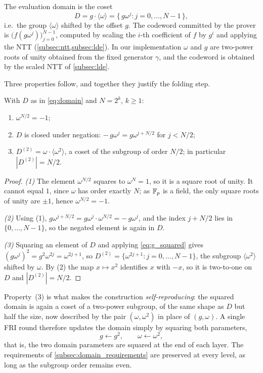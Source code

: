 The evaluation domain is the coset
%
\begin{equation}
\label{eq:domain}
D = g \cdot \langle \omega \rangle
  = \{\, g\omega^j : j = 0, \ldots, N-1 \,\},
\end{equation}
%
i.e.\ the group $\langle\omega\rangle$ shifted by the offset $g$. The
codeword committed by the prover is $\bigl(f(g\omega^j)\bigr)_{j=0}^{N-1}$,
computed by scaling the $i$-th coefficient of $f$ by $g^i$ and applying
the NTT (\cref{subsec:ntt,subsec:lde}). In our implementation $\omega$
and $g$ are two-power roots of unity obtained from the fixed generator
$\gamma$, and the codeword is obtained by the scaled NTT of
\cref{subsec:lde}.

Three properties follow, and together they justify the folding step.
 
\begin{proposition}
\label{prop:domain}
With $D$ as in \cref{eq:domain} and $N = 2^k$, $k \geq 1$:
\begin{enumerate}
  \item $\omega^{N/2} = -1$;
  \item $D$ is closed under negation: $-\,g\omega^{j} = g\omega^{j+N/2}$
    for $j < N/2$;
  \item $D^{(2)} = \omega \cdot \langle\omega^2\rangle$, a coset of the
    subgroup of order $N/2$; in particular $|D^{(2)}| = N/2$.
\end{enumerate}
\end{proposition}

\begin{proof}
\emph{(1)} The element $\omega^{N/2}$ squares to
$\omega^N = 1$, so it is a square root of unity. It cannot equal $1$,
since $\omega$ has order exactly $N$; as $\mathbb{F}_p$ is a field, the only
square roots of unity are $\pm 1$, hence $\omega^{N/2} = -1$.

\emph{(2)} Using (1),
$g\omega^{j+N/2} = g\omega^{j}\cdot\omega^{N/2} = -\,g\omega^{j}$, and
the index $j+N/2$ lies in $\{0,\dots,N-1\}$, so the negated element is
again in $D$.

\emph{(3)} Squaring an element of $D$ and applying \cref{eq:g_squared}
gives $(g\omega^{j})^2 = g^2\omega^{2j} = \omega^{2j+1}$, so
$D^{(2)} = \{\omega^{2j+1} : j = 0,\dots,N-1\}$, the subgroup
$\langle\omega^2\rangle$ shifted by $\omega$. By (2) the map
$x \mapsto x^2$ identifies $x$ with $-x$, so it is two-to-one on $D$
and $|D^{(2)}| = N/2$.
\end{proof}

Property~(3) is what makes the construction \emph{self-reproducing}:
the squared domain is again a coset of a two-power subgroup, of the
same shape as $D$ but half the size, now described by the pair
$(\omega, \omega^2)$ in place of $(g, \omega)$. A single FRI round
therefore updates the domain simply by squaring both parameters,
%
\begin{equation}
\label{eq:domain_update}
g \leftarrow g^2, \qquad \omega \leftarrow \omega^2,
\end{equation}
%
that is, the two domain parameters are squared at the end of each
layer. The requirements of
\cref{subsec:domain_requirements} are preserved at every level, as long
as the subgroup order remains even.

